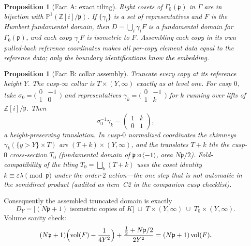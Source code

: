 \documentclass[11pt]{amsart}
\newtheorem{proposition}[theorem]{Proposition}
\newcommand{\ZZ}{\mathbb{Z}}
\newcommand{\p}{\mathfrak{p}}
\newcommand{\vol}{\mathrm{vol}}
\begin{document}
\begin{proposition}[Fact A: exact tiling]\label{prop:A}
Right cosets of $\Gamma_0(\p)$ in $\Gamma$ are in bijection with
$\mathbb{P}^1(\ZZ[i]/\p)$.  If $\{\gamma_i\}$ is a set of representatives and
$F$ is the Humbert fundamental domain, then
$D=\bigcup_i\gamma_i F$ is a fundamental domain for $\Gamma_0(\p)$, and
each copy $\gamma_i F$ is isometric to $F$.  Assembling each copy in its
own pulled-back reference coordinates makes all per-copy element data
equal to the reference data; only the boundary identifications know the
embedding.
\end{proposition}

\begin{proposition}[Fact B: collar assembly]\label{prop:B}
Truncate every copy at its reference height $Y$.  The cusp-$\infty$
collar is $T\times(Y,\infty)$ exactly as at level one.  For cusp $0$,
take $\sigma_0=\bigl(\begin{smallmatrix}0&-1\\1&0\end{smallmatrix}\bigr)$
and representatives $\gamma_k=\bigl(\begin{smallmatrix}0&-1\\1&k
\end{smallmatrix}\bigr)$ for $k$ running over lifts of $\ZZ[i]/\p$.  Then
\[
  \sigma_0^{-1}\gamma_k=\begin{pmatrix}1&k\\0&1\end{pmatrix},
\]
a \emph{height-preserving} translation.  In cusp-$0$ normalized
coordinates the chimneys $\gamma_k(\{y>Y\}\times T)$ are
$(T+k)\times(Y,\infty)$, and the translates $T+k$ tile the cusp-$0$
cross-section $T_0$ (fundamental domain of
$\p\rtimes\langle -1\rangle$, area $N\p/2$).  Fold-compatibility of the
tiling $T_0=\bigsqcup_k(T+k)$ uses the coset identity
$k\equiv\varepsilon\lambda\pmod\p$ under the order-$2$ action---the one
step that is not automatic in the semidirect product (audited as item~C2
in the companion cusp checklist).
\end{proposition}

Consequently the assembled truncated domain is exactly
\[
  D_Y
  =\bigl[(N\p+1)\text{ isometric copies of }K\bigr]
  \;\cup\;
  T\times(Y,\infty)
  \;\cup\;
  T_0\times(Y,\infty).
\]
Volume sanity check:
\[
  (N\p+1)\Bigl(\vol(F)-\frac{1}{4Y^2}\Bigr)
  +\frac{\tfrac12+N\p/2}{2Y^2}
  =(N\p+1)\,\vol(F).
\]
\end{document}

